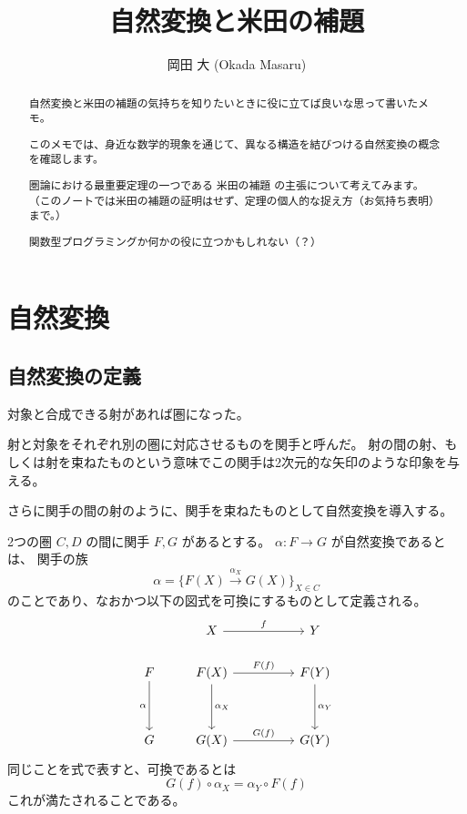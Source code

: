 \documentclass[uplatex,a4j,12pt,dvipdfmx]{jsarticle}
\title{
自然変換と米田の補題
}
\author{
岡田 大 (Okada Masaru)
}
\begin{document}
\maketitle

\begin{abstract}
	自然変換と米田の補題の気持ちを知りたいときに役に立てば良いな思って書いたメモ。

	このメモでは、身近な数学的現象を通じて、異なる構造を結びつける自然変換の概念を確認します。

	圏論における最重要定理の一つである $\textbf{米田の補題}$ の主張について考えてみます。
	（このノートでは米田の補題の証明はせず、定理の個人的な捉え方（お気持ち表明）まで。）

	関数型プログラミングか何かの役に立つかもしれない（？）


\end{abstract}

\section{自然変換}

\subsection{自然変換の定義}

対象と合成できる射があれば圏になった。

射と対象をそれぞれ別の圏に対応させるものを関手と呼んだ。
射の間の射、もしくは射を束ねたものという意味でこの関手は2次元的な矢印のような印象を与える。

さらに関手の間の射のように、関手を束ねたものとして自然変換を導入する。

2つの圏 $C,D$ の間に関手 $F,G$ があるとする。
$\alpha : F \to G$ が自然変換であるとは、
関手の族
$$\alpha = \Big\{ F(X) \xrightarrow{\alpha_{X}}G(X) \Big\}_{X \in C}$$
のことであり、なおかつ以下の図式を可換にするものとして定義される。
\[
	\begin{tikzcd}
		& X \arrow[rr, "f"]                                &  & Y                             \\
		F \arrow[dd, "\alpha"'] & F(X) \arrow[rr, "F(f)"] \arrow[dd, "\alpha_{X}"] &  & F(Y) \arrow[dd, "\alpha_{Y}"] \\
		&                                                  &  &                               \\
		G                       & G(X) \arrow[rr, "G(f)"]                          &  & G(Y)
	\end{tikzcd}
\]
同じことを式で表すと、可換であるとは
$$
	G(f) \circ \alpha_{X} = \alpha_{Y} \circ F(f)
$$
これが満たされることである。
\end{document}
